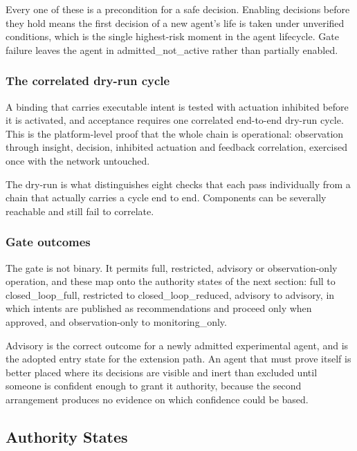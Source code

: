 Every one of these is a precondition for a safe decision. Enabling
decisions before they hold means the first decision of a new agent's
life is taken under unverified conditions, which is the single
highest-risk moment in the agent lifecycle. Gate failure leaves the
agent in admitted\_\allowbreak{}not\_\allowbreak{}active rather than
partially enabled.

\hypertarget{the-correlated-dry-run-cycle}{%
\subsubsection{The correlated dry-run cycle}\label{the-correlated-dry-run-cycle}}

A binding that carries executable intent is tested with actuation
inhibited before it is activated, and acceptance requires one correlated
end-to-end dry-run cycle. This is the platform-level proof that the
whole chain is operational: observation through insight, decision,
inhibited actuation and feedback correlation, exercised once with the
network untouched.

The dry-run is what distinguishes eight checks that each pass
individually from a chain that actually carries a cycle end to end.
Components can be severally reachable and still fail to correlate.

\hypertarget{gate-outcomes}{%
\subsubsection{Gate outcomes}\label{gate-outcomes}}

The gate is not binary. It permits full, restricted, advisory or
observation-only operation, and these map onto the authority states of
the next section: full to closed\_\allowbreak{}loop\_\allowbreak{}full,
restricted to closed\_\allowbreak{}loop\_\allowbreak{}reduced, advisory
to advisory, in which intents are published as recommendations and
proceed only when approved, and observation-only to
monitoring\_\allowbreak{}only.\allowbreak{}

Advisory is the correct outcome for a newly admitted experimental agent,
and is the adopted entry state for the extension path. An agent that
must prove itself is better placed where its decisions are visible and
inert than excluded until someone is confident enough to grant it
authority, because the second arrangement produces no evidence on which
confidence could be based.

\hypertarget{authority-states}{%
\subsection{Authority States}\label{authority-states}}

